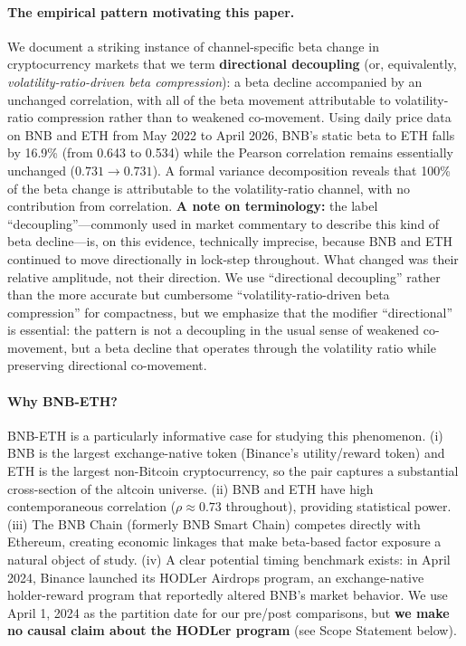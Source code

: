 \documentclass[11pt,a4paper]{article}
\begin{document}
\paragraph{The empirical pattern motivating this paper.} We document a striking instance of channel-specific beta change in cryptocurrency markets that we term \textbf{directional decoupling} (or, equivalently, \emph{volatility-ratio-driven beta compression}): a beta decline accompanied by an unchanged correlation, with all of the beta movement attributable to volatility-ratio compression rather than to weakened co-movement. Using daily price data on BNB and ETH from May 2022 to April 2026, BNB's static beta to ETH falls by 16.9\% (from 0.643 to 0.534) while the Pearson correlation remains essentially unchanged ($0.731 \to 0.731$). A formal variance decomposition reveals that 100\% of the beta change is attributable to the volatility-ratio channel, with no contribution from correlation. \textbf{A note on terminology:} the label ``decoupling''---commonly used in market commentary to describe this kind of beta decline---is, on this evidence, technically imprecise, because BNB and ETH continued to move directionally in lock-step throughout. What changed was their relative amplitude, not their direction. We use ``directional decoupling'' rather than the more accurate but cumbersome ``volatility-ratio-driven beta compression'' for compactness, but we emphasize that the modifier ``directional'' is essential: the pattern is not a decoupling in the usual sense of weakened co-movement, but a beta decline that operates through the volatility ratio while preserving directional co-movement.

\paragraph{Why BNB-ETH?} BNB-ETH is a particularly informative case for studying this phenomenon. (i) BNB is the largest exchange-native token (Binance's utility/reward token) and ETH is the largest non-Bitcoin cryptocurrency, so the pair captures a substantial cross-section of the altcoin universe. (ii) BNB and ETH have high contemporaneous correlation ($\rho \approx 0.73$ throughout), providing statistical power. (iii) The BNB Chain (formerly BNB Smart Chain) competes directly with Ethereum, creating economic linkages that make beta-based factor exposure a natural object of study. (iv) A clear potential timing benchmark exists: in April 2024, Binance launched its HODLer Airdrops program, an exchange-native holder-reward program that reportedly altered BNB's market behavior. We use April 1, 2024 as the partition date for our pre/post comparisons, but \textbf{we make no causal claim about the HODLer program} (see Scope Statement below).
\end{document}

